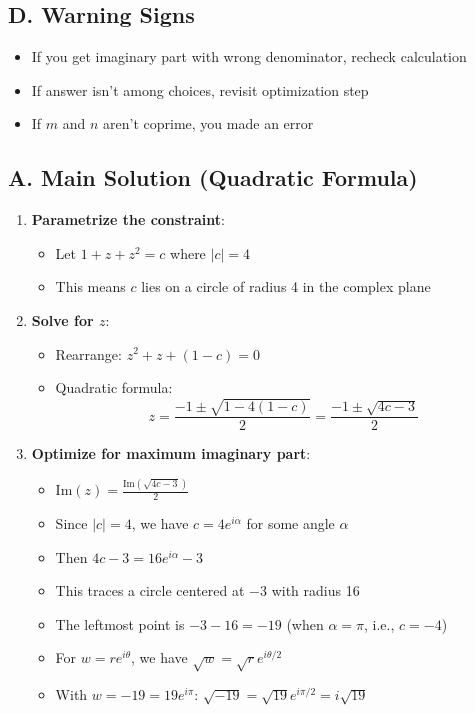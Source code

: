 \documentclass[11pt]{article}
\begin{document}
\begin{pitfallbox}
\subsection*{D. Warning Signs}
\begin{itemize}[leftmargin=*]
    \item If you get imaginary part with wrong denominator, recheck calculation
    \item If answer isn't among choices, revisit optimization step
    \item If $m$ and $n$ aren't coprime, you made an error
\end{itemize}
\end{pitfallbox}

\begin{solutionbox}
\subsection*{A. Main Solution (Quadratic Formula)}
\begin{enumerate}[leftmargin=*]
    \item \textbf{Parametrize the constraint}:
    \begin{itemize}
        \item Let $1 + z + z^2 = c$ where $|c| = 4$
        \item This means $c$ lies on a circle of radius 4 in the complex plane
    \end{itemize}
    
    \item \textbf{Solve for $z$}:
    \begin{itemize}
        \item Rearrange: $z^2 + z + (1-c) = 0$
        \item Quadratic formula:
        \[z = \frac{-1 \pm \sqrt{1 - 4(1-c)}}{2} = \frac{-1 \pm \sqrt{4c-3}}{2}\]
    \end{itemize}
    
    \item \textbf{Optimize for maximum imaginary part}:
    \begin{itemize}
        \item $\text{Im}(z) = \frac{\text{Im}(\sqrt{4c-3})}{2}$
        \item Since $|c| = 4$, we have $c = 4e^{i\alpha}$ for some angle $\alpha$
        \item Then $4c - 3 = 16e^{i\alpha} - 3$
        \item This traces a circle centered at $-3$ with radius 16
        \item The leftmost point is $-3 - 16 = -19$ (when $\alpha = \pi$, i.e., $c = -4$)
        \item For $w = re^{i\theta}$, we have $\sqrt{w} = \sqrt{r}e^{i\theta/2}$
        \item With $w = -19 = 19e^{i\pi}$: $\sqrt{-19} = \sqrt{19}e^{i\pi/2} = i\sqrt{19}$
    \end{itemize}
    

\end{enumerate}
\end{solutionbox}
\end{document}
